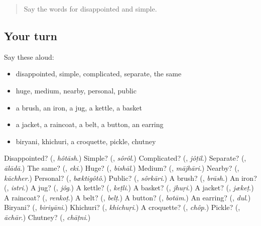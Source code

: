 \label{lesson:BN-R196-second-pass-words-from-chapters-192-196}



\begin{quote}
Say the words for disappointed and simple.
\end{quote}

\subsection*{Your turn}
Say these aloud:

\begin{itemize}
\raggedright
  \item disappointed, simple, complicated, separate, the same
  \item huge, medium, nearby, personal, public
  \item a brush, an iron, a jug, a kettle, a basket
  \item a jacket, a raincoat, a belt, a button, an earring
  \item biryani, khichuri, a croquette, pickle, chutney
\end{itemize}

\begin{tcolorbox}[breakable,colback=teal!4,colframe=teal!35!black,title={Before you move on}]
Disappointed? (\textbf{}, \emph{hôtāsh}.) Simple? (\textbf{}, \emph{sôrôl}.) Complicated? (\textbf{}, \emph{jôṭil}.) Separate? (\textbf{}, \emph{ālādā}.) The same? (\textbf{}, \emph{eki}.) Huge? (\textbf{}, \emph{bishāl}.) Medium? (\textbf{}, \emph{mājhāri}.) Nearby? (\textbf{}, \emph{kāchher}.) Personal? (\textbf{}, \emph{bæktigôtô}.) Public? (\textbf{}, \emph{sôrkāri}.) A brush? (\textbf{}, \emph{brāsh}.) An iron? (\textbf{}, \emph{istri}.) A jug? (\textbf{}, \emph{jôg}.) A kettle? (\textbf{}, \emph{keṭli}.) A basket? (\textbf{}, \emph{jhuṛi}.) A jacket? (\textbf{}, \emph{jækeṭ}.) A raincoat? (\textbf{}, \emph{renkoṭ}.) A belt? (\textbf{}, \emph{belṭ}.) A button? (\textbf{}, \emph{botām}.) An earring? (\textbf{}, \emph{dul}.) Biryani? (\textbf{}, \emph{biriyāni}.) Khichuri? (\textbf{}, \emph{khichuṛi}.) A croquette? (\textbf{}, \emph{chôp}.) Pickle? (\textbf{}, \emph{āchār}.) Chutney? (\textbf{}, \emph{chāṭni}.)
\end{tcolorbox}

